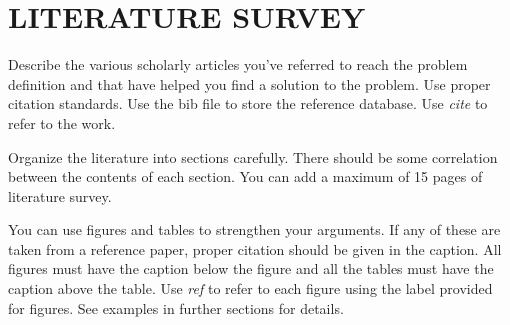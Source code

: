 \chapter{LITERATURE SURVEY}
\par Describe the various scholarly articles you've referred to reach the 
problem definition and that have helped you find a solution to the problem. Use 
proper citation standards. Use the bib file to store the reference database. Use 
\emph{cite} to refer to the work.

\par Organize the literature into sections carefully. There should be some 
correlation between the contents of each section. You can add a maximum of 15 
pages of literature survey\cite{kung1996regression}.

\par You can use figures and tables to strengthen your arguments. If any of 
these are taken from a reference paper, proper citation should be given in the 
caption. All figures must have the caption below the figure and all the tables 
must have the caption above the table. Use \emph{ref} to refer to each figure 
using the label provided for figures. See examples in further sections for 
details.
\newpage
